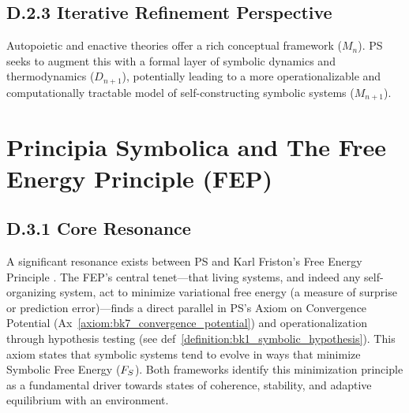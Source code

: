 \subsection*{D.2.3 Iterative Refinement Perspective}
\label{subsec:appD_autopoiesis_iterative_refinement_perspective}
Autopoietic and enactive theories offer a rich conceptual framework (\(M_n\)). PS seeks to augment this with a formal layer of symbolic dynamics and thermodynamics (\(D_{n+1}\)), potentially leading to a more operationalizable and computationally tractable model of self-constructing symbolic systems (\(M_{n+1}\)).
\section*{Principia Symbolica and The Free Energy Principle (FEP)} \label{sec:appD_ps_and_free_energy_principle}
\subsection*{D.3.1 Core Resonance}
\label{subsec:appD_fep_core_resonance}
A significant resonance exists between PS and Karl Friston's Free Energy Principle \cite{friston2010}. The FEP's central tenet—that living systems, and indeed any self-organizing system, act to minimize variational free energy (a measure of surprise or prediction error)—finds a direct parallel in PS's Axiom on Convergence Potential (Ax~\ref{axiom:bk7_convergence_potential}) and operationalization through hypothesis testing (see def~\ref{definition:bk1_symbolic_hypothesis}). This axiom states that symbolic systems tend to evolve in ways that minimize Symbolic Free Energy (\(F_S\)). Both frameworks identify this minimization principle as a fundamental driver towards states of coherence, stability, and adaptive equilibrium with an environment.
